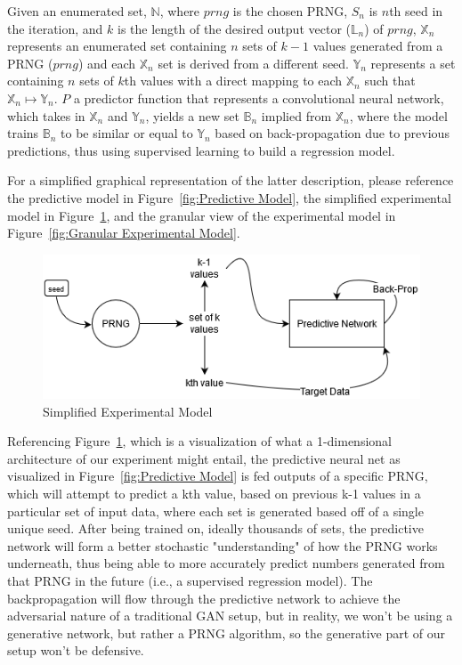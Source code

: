 \documentclass[conference]{IEEEtran}
\begin{document}
Given an enumerated set, $\mathbb{N}$,
where $prng$ is the chosen PRNG, $S_n$ is $n$th seed in the iteration, and $k$ is the length of the desired output vector ($\mathbb{L}_n$) of $prng$,
$\mathbb{X}_n$ represents an enumerated set containing $n$ sets of $k-1$ values generated from a PRNG ($prng$) and each $\mathbb{X}_n$ set is derived from a different seed. $\mathbb{Y}_n$ represents a set containing $n$ sets of $k$th values with a direct mapping to each $\mathbb{X}_n$ such that $\mathbb{X}_n \mapsto \mathbb{Y}_n$. $P$ a predictor function that represents a convolutional neural network, which takes in $\mathbb{X}_n$ and $\mathbb{Y}_n$, yields a new set $\mathbb{B}_n$ implied from $\mathbb{X}_n$, where the model trains $\mathbb{B}_n$ to be similar or equal to $\mathbb{Y}_n$ based on back-propagation due to previous predictions, thus using supervised learning to build a regression model.

For a simplified graphical representation of the latter description, please reference the predictive model in Figure~\ref{fig:Predictive Model}, the simplified experimental model in Figure~\ref{fig:Simplified Experimental Model}, and the granular view of the experimental model in Figure~\ref{fig:Granular Experimental Model}.


\begin{figure}[H]
\centering
\includegraphics[width=1\linewidth]{./Images/SimpleModel.png}
\caption{Simplified Experimental Model}
\label{fig:Simplified Experimental Model}
\end{figure}

Referencing Figure~\ref{fig:Simplified Experimental Model}, which is a visualization of what a 1-dimensional architecture of our experiment might entail, the predictive neural net as visualized in Figure~\ref{fig:Predictive Model} is fed outputs of a specific PRNG, which will attempt to predict a kth value, based on previous k-1 values in a particular set of input data, where each set is generated based off of a single unique seed. After being trained on, ideally thousands of sets, the predictive network will form a better stochastic "understanding" of how the PRNG works underneath, thus being able to more accurately predict numbers generated from that PRNG in the future (i.e., a supervised regression model). The backpropagation will flow through the predictive network to achieve the adversarial nature of a traditional GAN setup, but in reality, we won't be using a generative network, but rather a PRNG algorithm, so the generative part of our setup won't be defensive.
\end{document}
